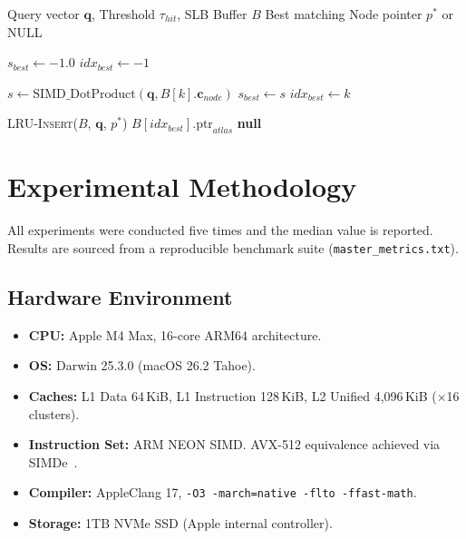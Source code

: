 \documentclass[10pt,twocolumn]{article}
\begin{document}
\begin{algorithm}[!htbp]
\caption{SLB Lookup Procedure}
\label{alg:slb_lookup}
\begin{algorithmic}[1]
\Require Query vector $\mathbf{q}$, Threshold $\tau_{hit}$, SLB Buffer $B$
\Ensure Best matching Node pointer $p^*$ or NULL

\State $s_{best} \gets -1.0$
\State $idx_{best} \gets -1$

    \State $s \gets \text{SIMD\_DotProduct}(\mathbf{q}, B[k].\mathbf{c}_{node})$
        \State $s_{best} \gets s$
        \State $idx_{best} \gets k$
    \EndIf
\EndFor

    \State \textsc{LRU-Insert}($B$, $\mathbf{q}$, $p^*$) 
    \State \Return $B[idx_{best}].\text{ptr}_{atlas}$ 
\Else
    \State \Return \textbf{null} 
\EndIf
\end{algorithmic}
\end{algorithm}

\section{Experimental Methodology}
\label{sec:methodology}

All experiments were conducted five times and the median value is reported. Results are sourced from a reproducible benchmark suite (\texttt{master\_metrics.txt}).

\subsection{Hardware Environment}

\begin{itemize}
    \item \textbf{CPU:} Apple M4 Max, 16-core ARM64 architecture.
    \item \textbf{OS:} Darwin 25.3.0 (macOS 26.2 Tahoe).
    \item \textbf{Caches:} L1 Data 64\,KiB, L1 Instruction 128\,KiB, L2 Unified 4,096\,KiB ($\times$16 clusters).
    \item \textbf{Instruction Set:} ARM NEON SIMD. AVX-512 equivalence achieved via SIMDe~\cite{simde}.
    \item \textbf{Compiler:} AppleClang 17, \texttt{-O3 -march=native -flto -ffast-math}.
    \item \textbf{Storage:} 1TB NVMe SSD (Apple internal controller).
\end{itemize}
\end{document}
